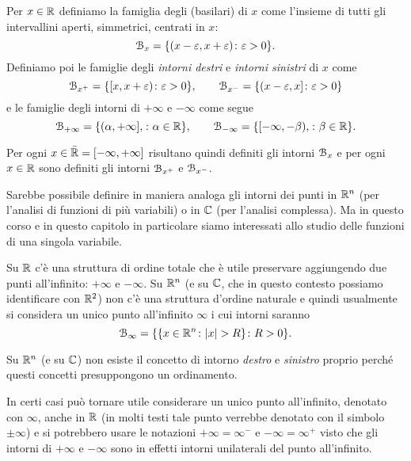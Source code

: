 \begin{definition}[intorno]
Per $x\in \mathbb R$ definiamo la famiglia degli  (basilari) di $x$
come l'insieme di tutti gli intervallini aperti, simmetrici, centrati in $x$:
\[
  \mathcal B_x = {\left\{  (x-\varepsilon, x+\varepsilon) \colon \varepsilon>0 \right\}}.
\]
Definiamo poi le famiglie 
degli \emph{intorni destri} e \emph{intorni sinistri}
di $x$ come
\[
  \mathcal B_{x^+} = {\left\{  [x, x+\varepsilon) \colon \varepsilon>0 \right\}},
  \qquad
  \mathcal B_{x^-} = {\left\{  (x-\varepsilon , x] \colon \varepsilon>0 \right\}}
\]
e le famiglie degli intorni di $+\infty$ e $-\infty$ come segue
\[
  \mathcal B_{+\infty} = {\left\{  (\alpha,+\infty], \colon \alpha \in \mathbb R  \right\}},\qquad
  \mathcal B_{-\infty} = {\left\{  [-\infty, -\beta), \colon \beta\in \mathbb R \right\}}.
\]

Per ogni $x\in \bar {\mathbb R} = [-\infty, +\infty]$
risultano quindi definiti gli intorni $\mathcal B_x$ e per
ogni $x\in \mathbb R$ sono definiti gli intorni $\mathcal B_{x^+}$ e $\mathcal B_{x^-}$.
\end{definition}

\begin{remark}
Sarebbe possibile definire in maniera analoga gli intorni dei punti in $\mathbb R^n$
(per l'analisi di funzioni di più variabili)
o in $\mathbb C$ (per l'analisi complessa).
Ma in questo corso e in questo capitolo in particolare siamo interessati 
allo studio delle funzioni di una singola variabile.

Su $\mathbb R$ c'è una struttura di ordine totale che è utile preservare aggiungendo
due punti all'infinito: $+\infty$ e $-\infty$.
Su $\mathbb R^n$ (e su $\mathbb C$, che in questo contesto possiamo identificare con $\mathbb R^2$)
non c'è una struttura d'ordine naturale e quindi
usualmente si considera un unico punto all'infinito $\infty$ i cui intorni
saranno
\[
  \mathcal B_\infty = {\left\{ {\left\{ x \in \mathbb R^n\colon {\left|x\right|}>R \right\}}\colon R>0 \right\}}.
\]

Su $\mathbb R^n$ (e su $\mathbb C$) non esiste il concetto di intorno \emph{destro}
e \emph{sinistro} proprio perché questi concetti presuppongono un ordinamento.

In certi casi può tornare utile considerare un unico punto all'infinito,
denotato con $\infty$, anche in $\mathbb R$ (in molti testi tale punto verrebbe
denotato con il simbolo $\pm\infty$)
e si potrebbero usare le notazioni $+\infty = \infty^-$ e $-\infty = \infty^
+$ visto che gli intorni di $+\infty$ e $-\infty$ sono in effetti intorni
unilaterali del punto all'infinito.
\end{remark}

